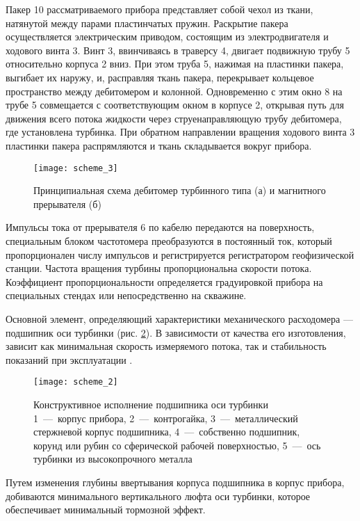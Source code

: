 Пакер 10 рассматриваемого прибора представляет собой чехол из ткани, натянутой между парами пластинчатых пружин. Раскрытие пакера осуществляется электрическим приводом, состоящим из электродвигателя и ходового винта 3. Винт 3, ввинчиваясь в травер­су 4, двигает подвижную трубу 5 относительно корпуса 2 вниз. При этом труба 5, нажимая на пластинки пакера, выгибает их наружу, и, расправляя ткань пакера, перекрывает кольцевое пространство меж­ду дебитомером и колонной. Одновременно с этим окно 8 на трубе 5 совмещается с соответствующим окном в корпусе 2, открывая путь для движения всего потока жидкости через струенаправляющую трубу дебитомера, где установлена турбинка. При обратном направ­лении вращения ходового винта 3 пластинки пакера распрямляются и ткань складывается вокруг прибора.

\begin{figure}[h]
\centering
\texttt{[image: scheme\_3]}
\caption{
Принципиальная схема дебитомер турбинного типа (а) и магнитного прерывателя (б)
}
\label{fig:scheme_3}
\end{figure}

Импульсы тока от прерывателя 6 по кабелю передаются на по­верхность, специальным блоком частотомера преобразуются в по­стоянный ток, который пропорционален числу импульсов и регистрируется регист­ратором геофизической станции. Частота вращения турбины пропор­циональна скорости потока. Коэффициент пропорциональности оп­ределяется градуировкой прибора на специальных стендах или не­посредственно на скважине.

Основной элемент, определяющий
характеристики механического расходомера ---
подшипник оси турбинки (рис. \ref{fig:scheme_2}). В зависимости от качества
его изготовления, зависит как минимальная скорость
измеряемого потока, так и стабильность показаний при
эксплуатации \cite{physfields}.

\begin{figure}[h]
\centering
\texttt{[image: scheme\_2]}
\caption{
Конструктивное исполнение подшипника оси турбинки \\
1~---~корпус прибора, 2~---~контрогайка,
3~---~металлический стержневой корпус подшипника,
4~---~собственно подшипник, корунд или рубин со сферической рабочей поверхностью,
5~---~ось турбинки из высокопрочного металла
}
\label{fig:scheme_2}
\end{figure}

Путем изменения глубины ввертывания корпуса подшипника в
корпус прибора, добиваются минимального вертикального люфта оси
турбинки, которое обеспечивает минимальный тормозной эффект.

